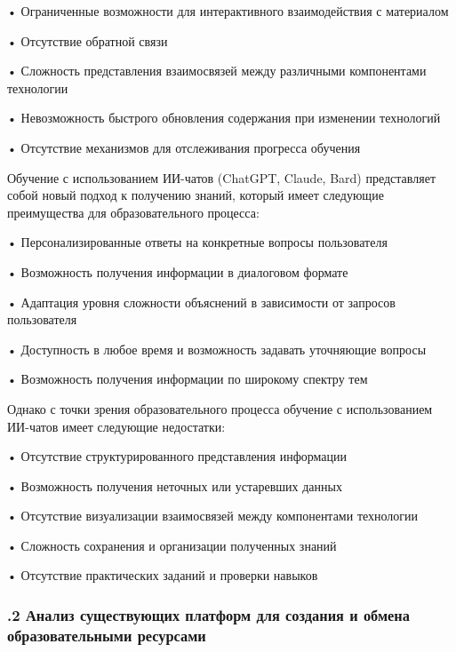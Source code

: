 {  \par \redline • Ограниченные возможности для интерактивного взаимодействия с материалом
  \par \redline • Отсутствие обратной связи
  \par \redline • Сложность представления взаимосвязей между различными компонентами технологии
  \par \redline • Невозможность быстрого обновления содержания при изменении технологий
  \par \redline • Отсутствие механизмов для отслеживания прогресса обучения

  \par \redline Обучение с использованием ИИ-чатов (ChatGPT, Claude, Bard) представляет собой новый подход к получению знаний, который имеет следующие преимущества для образовательного процесса:
  
  \par \redline • Персонализированные ответы на конкретные вопросы пользователя
  \par \redline • Возможность получения информации в диалоговом формате
  \par \redline • Адаптация уровня сложности объяснений в зависимости от запросов пользователя
  \par \redline • Доступность в любое время и возможность задавать уточняющие вопросы
  \par \redline • Возможность получения информации по широкому спектру тем
  
  \par \redline Однако с точки зрения образовательного процесса обучение с использованием ИИ-чатов имеет следующие недостатки:
  
  \par \redline • Отсутствие структурированного представления информации
  \par \redline • Возможность получения неточных или устаревших данных
  \par \redline • Отсутствие визуализации взаимосвязей между компонентами технологии
  \par \redline • Сложность сохранения и организации полученных знаний
  \par \redline • Отсутствие практических заданий и проверки навыков

  \par
}

\subtitlespace

\subsubsection*{ 
  \gostTitleFont
  .2 Анализ существующих платформ для создания и обмена образовательными ресурсами
} 

